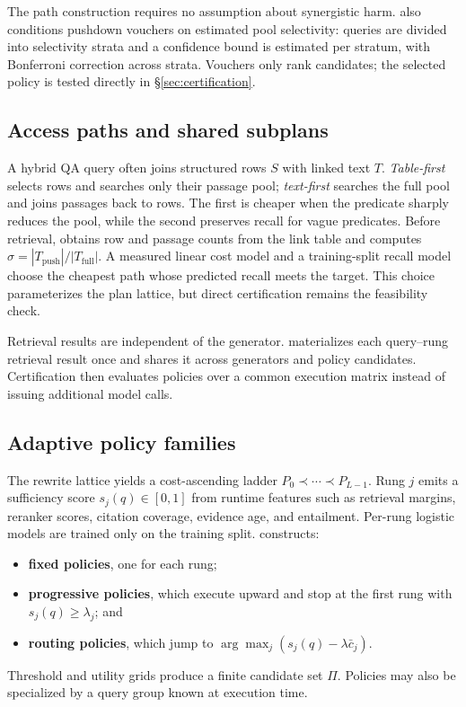 The path construction requires no assumption about synergistic harm.
\system also conditions pushdown vouchers on estimated pool selectivity:
queries are divided into selectivity strata and a confidence bound is
estimated per stratum, with Bonferroni correction across strata. Vouchers
only rank candidates; the selected policy is tested directly in
\S\ref{sec:certification}.

\subsection{Access paths and shared subplans}
\label{sec:planner}

A hybrid QA query often joins structured rows $S$ with linked text $T$.
\emph{Table-first} selects rows and searches only their passage pool;
\emph{text-first} searches the full pool and joins passages back to rows.
The first is cheaper when the predicate sharply reduces the pool, while
the second preserves recall for vague predicates. Before retrieval,
\system obtains row and passage counts from the link table and computes
$\sigma=|T_{\mathrm{push}}|/|T_{\mathrm{full}}|$. A measured linear cost
model and a training-split recall model choose the cheapest path whose
predicted recall meets the target. This choice parameterizes the plan
lattice, but direct certification remains the feasibility check.

Retrieval results are independent of the generator. \system materializes
each query--rung retrieval result once and shares it across generators and
policy candidates. Certification then evaluates policies over a common
execution matrix instead of issuing additional model calls.

\subsection{Adaptive policy families}
\label{sec:families}

The rewrite lattice yields a cost-ascending ladder
$P_0\prec\cdots\prec P_{L-1}$. Rung $j$ emits a sufficiency score
$s_j(q)\in[0,1]$ from runtime features such as retrieval margins, reranker
scores, citation coverage, evidence age, and entailment. Per-rung logistic
models are trained only on the training split. \system constructs:
\begin{itemize}
  \item \textbf{fixed policies}, one for each rung;
  \item \textbf{progressive policies}, which execute upward and stop at the
  first rung with $s_j(q)\geq\lambda_j$; and
  \item \textbf{routing policies}, which jump to
  $\arg\max_j(s_j(q)-\lambda\bar c_j)$.
\end{itemize}
Threshold and utility grids produce a finite candidate set $\Pi$. Policies
may also be specialized by a query group known at execution time.

